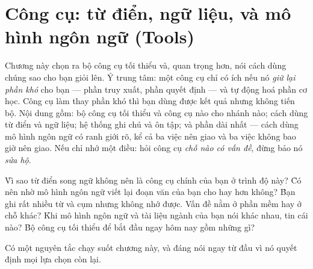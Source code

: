 \documentclass[../../english.tex]{subfiles}
\begin{document}
\chapter{Công cụ: từ điển, ngữ liệu, và mô hình ngôn ngữ (Tools)}

\begin{tomtat}
Chương này chọn ra bộ công cụ tối thiểu và, quan trọng hơn, nói cách dùng chúng sao cho bạn giỏi lên. Ý trung tâm: một công cụ chỉ có ích nếu nó \emph{giữ lại phần khó} cho bạn --- phần truy xuất, phần quyết định --- và tự động hoá phần cơ học. Công cụ làm thay phần khó thì bạn dùng được kết quả nhưng không tiến bộ. Nội dung gồm: bộ công cụ tối thiểu và công cụ nào cho nhánh nào; cách dùng từ điển và ngữ liệu; hệ thống ghi chú và ôn tập; và phần dài nhất --- cách dùng mô hình ngôn ngữ có ranh giới rõ, kể cả ba việc nên giao và ba việc không bao giờ nên giao. Nếu chỉ nhớ một điều: hỏi công cụ \emph{chỗ nào có vấn đề}, đừng bảo nó \emph{sửa hộ}.
\end{tomtat}

\begin{nentang}
\end{nentang}

\begin{khoigoi}
\h{Vì sao từ điển song ngữ không nên là công cụ chính của bạn ở trình độ này?}
\h{Có nên nhờ mô hình ngôn ngữ viết lại đoạn văn của bạn cho hay hơn không?}
\h{Bạn ghi rất nhiều từ và cụm nhưng không nhớ được. Vấn đề nằm ở phần mềm hay ở chỗ khác?}
\h{Khi mô hình ngôn ngữ và tài liệu ngành của bạn nói khác nhau, tin cái nào?}
\h{Bộ công cụ tối thiểu để bắt đầu ngay hôm nay gồm những gì?}
\end{khoigoi}

Có một nguyên tắc chạy suốt chương này, và đáng nói ngay từ đầu vì nó quyết định mọi lựa chọn còn lại.
\end{document}
